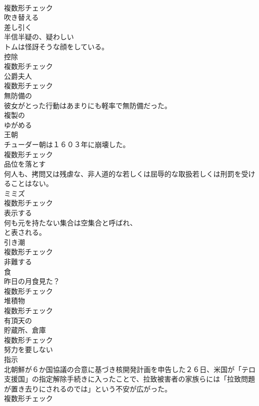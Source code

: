 \documentclass[8pt]{extreport}
\begin{document}
\begin{CJK}{UTF8}{min}
\\	複数形チェック
\\	[動詞]	吹き替える	
\\	[動詞]	差し引く	
\\	[形容詞]	半信半疑の、疑わしい	
\\	トムは怪訝そうな顔をしている。	
\\	[名詞]	控除	
\\	複数形チェック
\\	[名詞]	公爵夫人	
\\	複数形チェック
\\	[形容詞]	無防備の	
\\	彼女がとった行動はあまりにも軽率で無防備だった。	
\\	[形容詞]	複製の	
\\	[動詞]	ゆがめる	
\\	[名詞]	王朝	
\\	チューダー朝は１６０３年に崩壊した。	
\\	複数形チェック
\\	[動詞]	品位を落とす	
\\	何人も、拷問又は残虐な、非人道的な若しくは屈辱的な取扱若しくは刑罰を受けることはない。	
\\	[名詞]	ミミズ	
\\	複数形チェック
\\	[動詞]	表示する	
\\	何も元を持たない集合は空集合と呼ばれ、
\\	と表される。	
\\	[名詞]	引き潮	
\\	複数形チェック
\\	[動詞]	非難する	
\\	[名詞]	食	
\\	昨日の月食見た？	
\\	複数形チェック
\\	[名詞]	堆積物	
\\	複数形チェック
\\	[形容詞]	有頂天の	
\\	[名詞]	貯蔵所、倉庫	
\\	複数形チェック
\\	[形容詞]	努力を要しない	
\\	[名詞]	指示	
\\	北朝鮮が６か国協議の合意に基づき核開発計画を申告した２６日、米国が「テロ支援国」の指定解除手続きに入ったことで、拉致被害者の家族らには「拉致問題が置き去りにされるのでは」という不安が広がった。	
\\	複数形チェック

\end{CJK}
\end{document}
